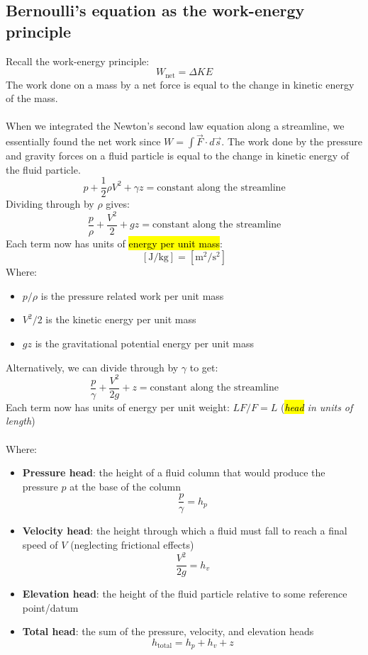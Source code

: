 ﻿\documentclass[12pt]{article}
\begin{document}
\subsection*{Bernoulli's equation as the work-energy principle}
Recall the work-energy principle:
\[W_\text{net} = \Delta KE\]
The work done on a mass by a net force is equal to the change in kinetic energy of the mass.\\\\
When we integrated the Newton's second law equation along a streamline, we essentially found the net work since $W = \int \vec{F}\cdot d\vec{s}$. The work done by the pressure and gravity forces on a fluid particle is equal to the change in kinetic energy of the fluid particle.
\[p+\frac{1}{2}\rho V^2+\gamma z =\text{constant along the streamline}\]
Dividing through by $\rho$ gives:
\[\frac{p}{\rho}+\frac{V^2}{2}+gz =\text{constant along the streamline}\]
Each term now has units of \hl{energy per unit mass}:
\[\left[\unit{\joule\per\kilogram}\right]= \left[\unit{\meter\squared\per\second\squared}\right]\]
\newpage
Where:
\begin{itemize}
    \item $p/\rho$ is the pressure related work per unit mass
    \item $V^2/2$ is the kinetic energy per unit mass
    \item $gz$ is the gravitational potential energy per unit mass
\end{itemize}
Alternatively, we can divide through by $\gamma$ to get:
\[\frac{p}{\gamma} +\frac{V^2}{2g} + z = \text{constant along the streamline}\]
Each term now has units of energy per unit weight: $LF/F = L$ (\textit{\hl{head} in units of length})\\\\
Where:
\begin{itemize}
    \item \textbf{Pressure head}: the height of a fluid column that would produce the pressure $p$ at the base of the column
    \[\frac{p}{\gamma} = h_p\]
    \item \textbf{Velocity head}: the height through which a fluid must fall to reach a final speed of $V$ (neglecting frictional effects)
    \[\frac{V^2}{2g} = h_v\]
    \item \textbf{Elevation head}: the height of the fluid particle relative to some reference point/datum
    \item \textbf{Total head}: the sum of the pressure, velocity, and elevation heads
    \[h_\text{total} = h_p + h_v + z\]
\end{itemize}
\end{document}
